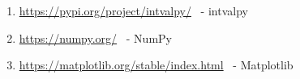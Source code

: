 \begin{enumerate}
\item \url{https://pypi.org/project/intvalpy/} \ - intvalpy
\item \url{https://numpy.org/} \ - NumPy
\item \url{https://matplotlib.org/stable/index.html} \ - Matplotlib
\end{enumerate}